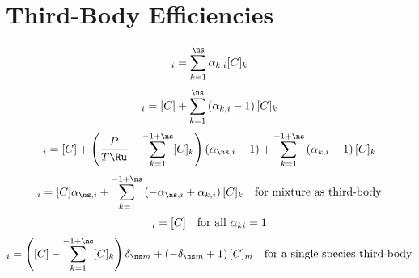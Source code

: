\documentclass[a4paper,10pt]{article}
\begin{document}
\section{Third-Body Efficiencies}
\begin{dmath} [X]_{i} = \sum_{k=1}^{\ns} \alpha_{k,i} [C]_{k}\end{dmath} 
\begin{dmath} [X]_{i} = [C] + \sum_{k=1}^{\ns} \left(\alpha_{k,i} - 1\right) [C]_{k}\end{dmath} 
\begin{dmath} [X]_{i} = [C] + \left(\frac{P}{T \Ru} - \sum_{k=1}^{-1 + \ns} [C]_{k}\right) \left(\alpha_{\ns,i} - 1\right) + \sum_{k=1}^{-1 + \ns} \left(\alpha_{k,i} - 1\right) [C]_{k}\end{dmath} 
\begin{dmath} [X]_{i}=[C] \alpha_{\ns,i} + \sum_{k=1}^{-1 + \ns} \left(- \alpha_{\ns,i} + \alpha_{k,i}\right) [C]_{k}\text{\quad for mixture as third-body}\end{dmath} 
\begin{dmath} [X]_{i}=[C]\text{\quad for all $\alpha_{ki} = 1$}\end{dmath} 
\begin{dmath} [X]_{i}=\left([C] - \sum_{k=1}^{-1 + \ns} [C]_{k}\right) \delta_{\ns m} + \left(- \delta_{\ns m} + 1\right) [C]_{m}\text{\quad for a single species third-body}\end{dmath} 
\end{document}
